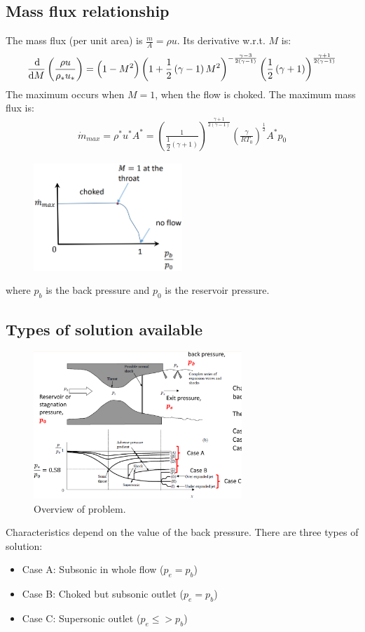 \subsection{Mass flux relationship}
The mass flux (per unit area) is $\frac{m}{A} = \rho u$. Its derivative w.r.t. $M$ is:
\begin{gather}
    \frac{\dif}{\dif M}\left(\frac{\rho u}{\rho_* u_*}\right) = \left(1-M^2\right)\left(1 + \frac{1}{2}\left(\gamma - 1\right)M^2\right)^{-\frac{\gamma -3}{2\left(\gamma - 1\right)}}\left(\frac{1}{2}\left(\gamma + 1\right)\right)^{\frac{\gamma + 1}{2\left(\gamma -1\right)}}
\end{gather}
The maximum occurs when $M=1$, when the flow is choked. The maximum mass flux is:
\begin{gather}
    \dot{m}_{max} = \rho^* u^* A^* = \left(\frac{1}{\dfrac{1}{2}\left(\gamma + 1\right)}\right)^{\frac{\gamma + 1}{2\left(\gamma -1\right)}}\left(\frac{\gamma}{RT_0}\right)^{\frac{1}{2}}A^* p_0
\end{gather}
\begin{figure}[H]
    \centering
    \includegraphics[width = 0.5\textwidth]{./img/diagram55.png}
    \caption{}
\end{figure}
where $p_b$ is the back pressure and $p_0$ is the reservoir pressure.
\subsection{Types of solution available}
\begin{figure}[H]
    \centering
    \includegraphics[width = 0.7\textwidth]{./img/diagram56.png}
    \caption{Overview of problem.}
\end{figure}
Characteristics depend on the value of the back pressure. There are three types of solution:
\begin{itemize}[noitemsep]
    \item Case A: Subsonic in whole flow ($p_e = p_b$)
    \item Case B: Choked but subsonic outlet ($p_e = p_b$)
    \item Case C: Supersonic outlet ($p_e \leq > p_b$)
\end{itemize}
